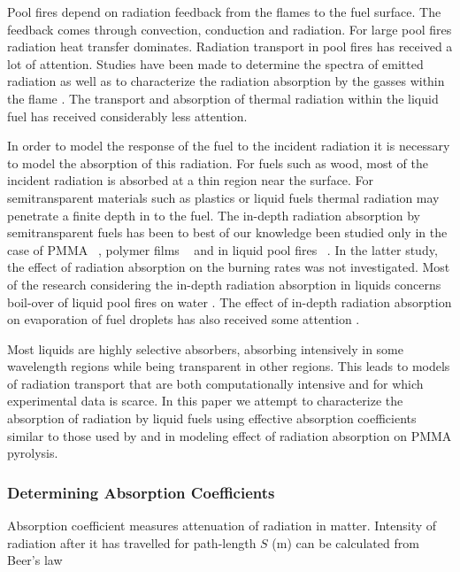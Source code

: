 Pool fires depend on radiation feedback from the flames to the fuel surface. The feedback comes through convection, conduction and radiation. For large pool fires radiation heat transfer dominates. Radiation transport in pool fires has received a lot of attention. Studies have been made to determine the spectra of emitted radiation \cite{Suo-Anttila:PCT2009} as well as to characterize the radiation absorption by the gasses within the flame \cite{Wakatsuki:CST2008}. The transport and absorption of thermal radiation within the liquid fuel has received considerably less attention.

In order to model the response of the fuel to the incident radiation it is necessary to model the absorption of this radiation. For fuels such as wood, most of the incident radiation is absorbed at a thin region near the surface. For semitransparent materials such as plastics or liquid fuels thermal radiation may penetrate a finite depth in to the fuel.  The in-depth radiation absorption by semitransparent fuels has been to best of our knowledge been studied only in the case of PMMA ~\cite{Stoliarov:CF2009}, polymer films ~\cite{Tsilingiris:ECM2003} and in liquid pool fires ~\cite{Suo-Anttila:PCT2009}.  In the latter study, the effect of radiation absorption on the burning rates was not investigated.  Most of the research considering the in-depth radiation absorption in liquids concerns boil-over of liquid pool fires on water \cite{Broeckmann:JLPPI1995}. The effect of in-depth radiation absorption on evaporation of fuel droplets has also received some attention \cite{Sazhin:IJHMT2004b}.

Most liquids are highly selective absorbers, absorbing intensively in some wavelength regions while being transparent in other regions.  This leads to models of radiation transport that are both computationally intensive and for which experimental data is scarce. In this paper we attempt to characterize the absorption of radiation by liquid fuels using effective absorption coefficients similar to those used by \cite{Madhav:IJMP1995} and \cite{Manohar:JHT1995} in modeling effect of radiation absorption on PMMA pyrolysis.

\subsubsection{Determining Absorption Coefficients}

Absorption coefficient measures attenuation of radiation in matter.  Intensity of radiation after it has travelled for path-length $S$ (m) can be calculated from Beer's law

